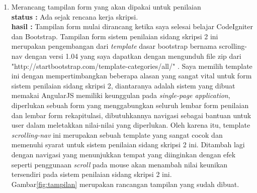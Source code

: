 \documentclass[a4paper,twoside]{article}
\begin{document}
\begin{enumerate}
		\item Merancang tampilan form yang akan dipakai untuk penilaian\\
		{\bf status :} Ada sejak rencana kerja skripsi.\\
		{\bf hasil :} Tampilan form mulai dirancang ketika saya selesai belajar CodeIgniter dan Bootstrap. Tampilan form sistem penilaian sidang skripsi 2 ini merupakan pengembangan dari \textit{template} dasar bootstrap bernama scrolling-nav dengan versi 1.04 yang saya dapatkan dengan mengunduh file zip dari "http://startbootstrap.com/template-categories/all/" . Saya memilih template ini dengan mempertimbangkan beberapa alasan yang sangat vital untuk form sistem penilaian sidang skripsi 2, diantaranya adalah sistem yang dibuat memakai AngularJS memiliki keunggulan pada \textit{single-page application}, diperlukan sebuah form yang menggabungkan seluruh lembar form penilaian dan lembar form rekapitulasi, dibutuhkannya navigasi sebagai bantuan untuk user dalam meletakkan nilai-nilai yang diperlukan. Oleh karena itu, template \textit{scrolling-nav} ini merupakan sebuah template yang sangat cocok dan memenuhi syarat untuk sistem penilaian sidang skripsi 2 ini. Ditambah lagi dengan navigasi yang menunjukkan tempat yang diinginkan dengan efek seperti penggunaan \textit{scroll} pada mouse akan menambah nilai keunikan tersendiri pada sistem penilaian sidang skripsi 2 ini.\\
		Gambar\ref{fig:tampilan} merupakan rancangan tampilan yang sudah dibuat.\\
		

\end{enumerate}
\end{document}

